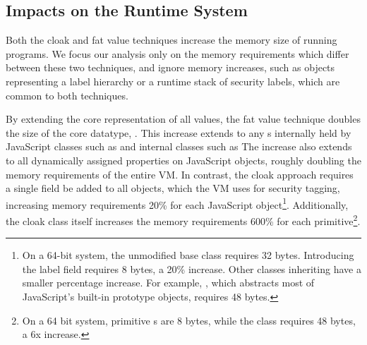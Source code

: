 \medskip
\begin{figure}[h]
\centering
{}
\end{figure}
\medskip

\subsection{Impacts on the Runtime System}

Both the cloak and fat value techniques increase the memory size of running programs.
We focus our analysis only on the memory requirements which differ between these two techniques, and ignore memory increases, such as objects representing a label hierarchy or a runtime stack of security labels, which are common to both techniques.

By extending the core representation of all values, the fat value technique doubles the size of the core datatype, .
This increase extends to any s internally held by JavaScript classes such as  and internal classes such as 
The increase also extends to all dynamically assigned properties on JavaScript objects, roughly doubling the memory requirements of the entire VM.
In contrast, the cloak approach requires a single field be added to all objects, which the VM uses for security tagging, increasing memory requirements 20\% for each JavaScript object\footnote{On a 64-bit system, the unmodified  base class requires 32 bytes. Introducing the label field requires 8 bytes, a 20\% increase. Other classes inheriting  have a smaller percentage increase. For example, , which abstracts most of JavaScript's built-in prototype objects, requires 48 bytes.}.
Additionally, the cloak class itself increases the memory requirements 600\% for each primitive\footnote{On a 64 bit system, primitive s are 8 bytes, while the  class requires 48 bytes, a 6x increase.}.

